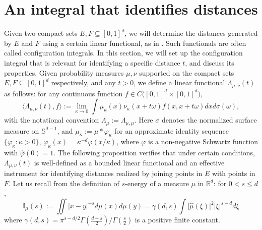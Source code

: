 \documentclass[a4paper,11pt]{amsart}
\numberwithin{equation}{section}
\begin{document}
\section{An integral that identifies distances} \label{configuration-integral-section}
\noindent Given two compact sets $E, F \subseteq [0,1]^d$, we will determine the distances generated by $E$ and $F$ using a certain linear functional, as in \cite{1986Bourgain}. Such functionals are often called configuration integrals. In this section, we will set up the configuration integral that is relevant for identifying a specific distance $t$, and discuss its properties. 
\vskip0.1in
\noindent Given probability measures $\mu, \nu$ supported on the compact sets $E, F \subseteq [0,1]^d$ respectively, and any $t > 0$, we define a linear functional $\Lambda_{\mu, \nu}(t)$ as follows:  for any continuous function $f \in C\bigl([0,1]^d \times [0,1]^d \bigr)$, 
\begin{equation} \label{def-Lambda}
\langle \Lambda_{\mu, \nu}(t), f \rangle  := \lim_{\kappa \rightarrow 0} \int \mu_{\kappa}(x) \nu_{\kappa}(x + t \omega) f(x, x+ t\omega) dx d\sigma(\omega),  
\end{equation} 
with the notational convention $\Lambda_{\mu} := \Lambda_{\mu, \mu}$. Here $\sigma$ denotes the normalized surface measure on $\mathbb S^{d-1}$, and $\mu_{\kappa} := \mu \ast \varphi_{\kappa}$ for an approximate identity sequence $\{\varphi_{\kappa} : \kappa > 0\}$, $\varphi_{\kappa}(x) = \kappa^{-d} \varphi(x/\kappa)$, where $\varphi$ is a non-negative Schwartz function with $\widehat{\varphi}(0) = 1$. The following proposition verifies that under certain conditions, $\Lambda_{\mu, \nu}(t)$ is well-defined as a bounded linear functional and an effective instrument for identifying distances realized by joining points in $E$ with points in $F$.
\vskip0.1in
\noindent Let us recall from \cite[Chapters 2 and 3, Theorems 2.8 and 3.10]{Mattila-Book2} the definition of $s$-energy of a measure $\mu$ in $\mathbb R^d$: for $0 < s \leq d$, 
\begin{equation} \label{def-s-dim-energy}
\mathbb I_\mu(s) := \iint |x-y|^{-s} d\mu(x) d\mu(y) = \gamma(d, s) \int \bigl| \widehat{\mu}(\xi) \bigr|^{2} |\xi|^{s-d} d\xi
\end{equation} 
where $\gamma(d, s) = \pi^{s - d/2} \Gamma(\frac{d-s}{2})/\Gamma(\frac{s}{2})$ is a positive finite constant. 
\end{document}
